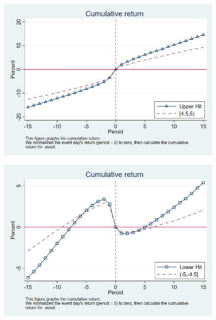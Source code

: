 \documentclass[12pt]{article}
\begin{document}
\begin{appendices}
\begin{figure}[htbp]
\centering
\includegraphics[width=0.7\linewidth]{CUR}
\caption{}
\label{fig:cur}
\end{figure}

\begin{figure}[htbp]
\centering
\includegraphics[width=0.7\linewidth]{CLR}
\caption{}
\label{fig:clr}
\end{figure}



















\FloatBarrier
\begin{table}[htbp]
\centering

{}
\end{table}

\end{appendices}
\end{document}
